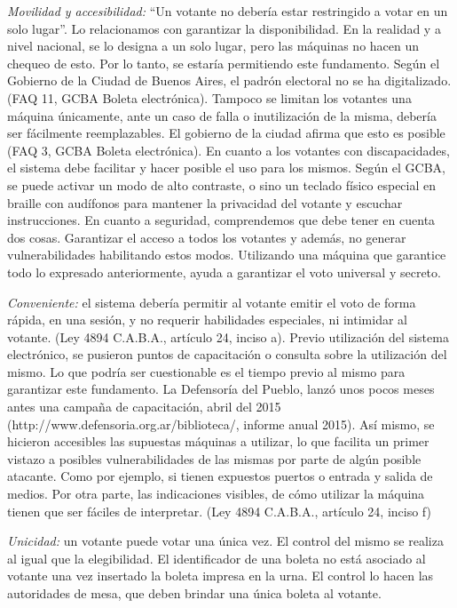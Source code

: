\textit{Movilidad y accesibilidad:} “Un votante no debería estar restringido a votar en un solo lugar”. Lo relacionamos con garantizar la disponibilidad. En la realidad y a nivel nacional, se lo designa a un solo lugar, pero las máquinas no hacen un chequeo de esto. Por lo tanto, se estaría permitiendo este fundamento. Según el Gobierno de la Ciudad de Buenos Aires, el padrón electoral no se ha digitalizado. (FAQ 11, GCBA Boleta electrónica). Tampoco se limitan los votantes una máquina únicamente, ante un caso de falla o inutilización de la misma, debería ser fácilmente reemplazables. El gobierno de la ciudad afirma que esto es posible (FAQ 3, GCBA Boleta electrónica).
En cuanto a los votantes con discapacidades, el sistema debe facilitar y hacer posible el uso para los mismos. Según el GCBA, se puede activar un modo de alto contraste, o sino un teclado físico especial en braille con audífonos para mantener la privacidad del votante y escuchar instrucciones. En cuanto a seguridad, comprendemos que debe tener en cuenta dos cosas. Garantizar el acceso a todos los votantes y además, no generar vulnerabilidades habilitando estos modos. Utilizando una máquina que garantice todo lo expresado anteriormente, ayuda a garantizar el voto universal y secreto.

\textit{Conveniente:} el sistema debería permitir al votante emitir el voto de forma rápida, en una sesión, y no requerir habilidades especiales, ni intimidar al votante. (Ley 4894 C.A.B.A., artículo 24, inciso a). Previo utilización del sistema electrónico, se pusieron puntos de capacitación o consulta sobre la utilización del mismo. Lo que podría ser cuestionable es el tiempo previo al mismo para garantizar este fundamento. La Defensoría del Pueblo, lanzó unos pocos meses antes una campaña de capacitación, abril del 2015 (http://www.defensoria.org.ar/biblioteca/, informe anual 2015). Así mismo, se hicieron accesibles las supuestas máquinas a utilizar, lo que facilita un primer vistazo a posibles vulnerabilidades de las mismas por parte de algún posible atacante. Como por ejemplo, si tienen expuestos puertos o entrada y salida de medios. Por otra parte, las indicaciones visibles, de cómo utilizar la máquina tienen que ser fáciles de interpretar. (Ley 4894 C.A.B.A., artículo 24, inciso f)

\textit{Unicidad:} un votante puede votar una única vez. El control del mismo se realiza al igual que la elegibilidad. El identificador de una boleta no está asociado al votante una vez insertado la boleta impresa en la urna. El control lo hacen las autoridades de mesa, que deben brindar una única boleta al votante.


